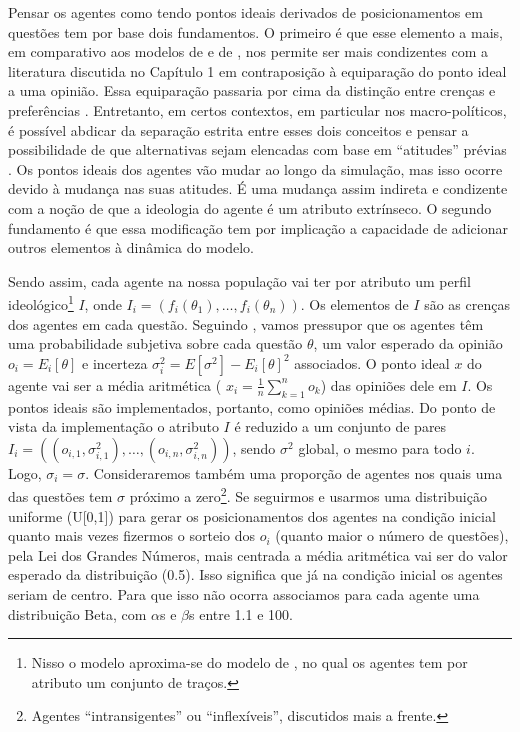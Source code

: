 Pensar os agentes como tendo pontos ideais derivados de posicionamentos em
questões tem por base dois fundamentos. O primeiro é que esse elemento a mais,
em comparativo aos modelos de  e de
, nos permite ser mais condizentes com a
literatura discutida no Capítulo 1 em contraposição à equiparação do ponto ideal
a uma opinião. Essa equiparação passaria por cima da distinção entre crenças e
preferências \cite{list2009judgment}. Entretanto, em certos contextos, em
particular nos macro-políticos, é possível abdicar da separação estrita entre
esses dois conceitos e pensar a possibilidade de que alternativas sejam
elencadas com base em ``atitudes'' prévias
\cite{binmore2008rational,laver2014measuring}. Os pontos ideais dos
agentes vão mudar ao longo da simulação, mas isso ocorre devido à mudança nas
suas atitudes. É uma mudança assim indireta e condizente com a noção de que a
ideologia do agente é um atributo extrínseco. O segundo fundamento é que essa
modificação tem por implicação a capacidade de adicionar outros elementos à
dinâmica do modelo.

Sendo assim, cada agente na nossa população vai ter por atributo um perfil
ideológico\footnote{Nisso o modelo aproxima-se do modelo de
  , no qual os agentes tem por atributo um
  conjunto de traços.} \(I\), onde \(I_i = (f_i(\theta_1), \ldots, f_i(\theta_n)) \). Os
elementos de \(I\) são as crenças dos agentes em cada questão. Seguindo
, vamos pressupor que os agentes têm uma
probabilidade subjetiva sobre cada questão \(\theta\), um valor esperado da opinião
\( o_i = E_i[\theta]\) e incerteza \( \sigma_i^2 = E[\sigma^2] - E_ i[\theta]^2\) associados. O
ponto ideal \(x\) do agente vai ser a média aritmética ( \(x_i =
\frac{1}{n}\sum_{k=1}^{n} o_k\)) das opiniões dele em \(I\). Os pontos ideais são
implementados, portanto, como opiniões médias. Do ponto de vista da
implementação o atributo \(I\) é reduzido a um conjunto de pares \(I_i =
((o_{i,1},\sigma_{i,1}^2), \ldots, (o_{i,n}, \sigma_{i,n}^2) )\), sendo \(\sigma^2\) global, o mesmo
para todo \(i\). Logo, \(\sigma_i = \sigma\). Consideraremos também uma proporção de
agentes nos quais uma das questões tem \(\sigma\) próximo a zero\footnote{Agentes
  ``intransigentes'' ou ``inflexíveis'', discutidos mais a frente.}. Se
seguirmos  e usarmos uma distribuição uniforme
(U[0,1]) para gerar os posicionamentos dos agentes na condição inicial quanto
mais vezes fizermos o sorteio dos \(o_i\) (quanto maior o número de questões),
pela Lei dos Grandes Números, mais centrada a média aritmética vai ser do valor
esperado da distribuição (0.5). Isso significa que já na condição inicial os
agentes seriam de centro. Para que isso não ocorra associamos para cada agente
uma distribuição Beta, com \(\alpha\)s e \(\beta\)s entre 1.1 e 100.

